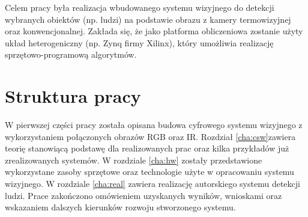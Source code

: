 Celem pracy była realizacja wbudowanego systemu wizyjnego do detekcji wybranych obiektów (np. ludzi) na podstawie obrazu z kamery termowizyjnej oraz konwencjonalnej. 
Zakłada się, że jako platforma obliczeniowa zostanie użyty układ heterogeniczny (np. Zynq firmy Xilinx), który umożliwia realizację sprzętowo-programową algorytmów.

\section{Struktura pracy}

W pierwszej części pracy została opisana budowa cyfrowego systemu wizyjnego z wykorzystaniem połączonych obrazów RGB oraz IR. 
Rozdział \ref{cha:csw}zawiera teorię stanowiącą podstawę dla realizowanych prac oraz kilka 
przykładów już zrealizowanych systemów. 
W rozdziale \ref{cha:hw} zostały przedstawione wykorzystane zasoby sprzętowe oraz technologie użyte w opracowaniu systemu wizyjnego.
W rozdziale \ref{cha:real} zawiera realizację autorskiego systemu detekcji ludzi. 
Prace zakończono omówieniem uzyskanych wyników, wnioskami oraz wskazaniem dalszych kierunków rozwoju stworzonego systemu.

